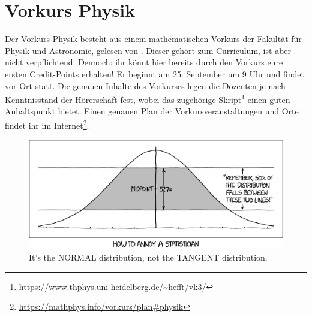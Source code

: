\section{Vorkurs Physik}
Der Vorkurs Physik besteht aus einem mathematischen Vorkurs der Fakultät für Physik und Astronomie, gelesen von \dozentvorkurs. Dieser gehört zum Curriculum, ist aber nicht verpflichtend. Dennoch: ihr könnt hier bereits durch den Vorkurs eure ersten Credit-Points erhalten! Er beginnt am 25. September um 9 Uhr und findet vor Ort statt. Die genauen Inhalte des Vorkurses legen die Dozenten je nach Kenntnisstand der Hörerschaft fest, wobei das zugehörige Skript\footnote{\url{https://www.thphys.uni-heidelberg.de/~hefft/vk3/}} einen guten Anhaltspunkt bietet. Einen genauen Plan der Vorkursveranstaltungen und Orte findet ihr im Internet\footnote{\url{https://mathphys.info/vorkurs/plan\#physik}}.


\begin{figure}[!b]
    \centering
    \includegraphics[width=\textwidth]{bilder/normal_distribution_2x.png}
    \caption*{It's the NORMAL distribution, not the TANGENT distribution.}
\end{figure}

